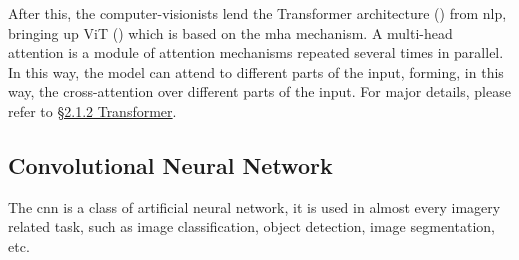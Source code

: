 After this, the computer-visionists lend the Transformer architecture (\cite{transformer_paper}) from \gls{nlp}, bringing up ViT (\cite{vit_paper}) which is based on the \gls{mha} mechanism.
A multi-head attention is a module of attention mechanisms repeated several times in parallel.
In this way, the model can attend to different parts of the input, forming, in this way, the cross-attention over different parts of the input.
For major details, please refer to \hyperref[subsec:transformer]{\S2.1.2 Transformer}.


\subsection{Convolutional Neural Network}\label{subsec:conv-neural-network}
The \gls{cnn} is a class of artificial neural network, it is used in almost every imagery related task, such as image classification, object detection, image segmentation, etc.

